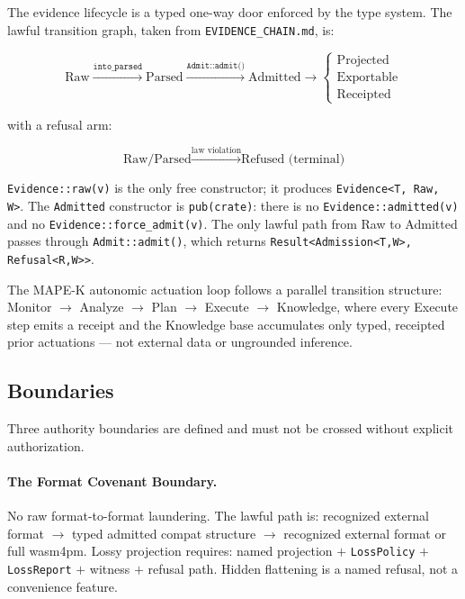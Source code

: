 The evidence lifecycle is a typed one-way door enforced by the type system. The lawful
transition graph, taken from \texttt{EVIDENCE\_CHAIN.md}, is:

\[
  \text{Raw} \xrightarrow{\texttt{into\_parsed}} \text{Parsed}
  \xrightarrow{\texttt{Admit::admit()}} \text{Admitted}
  \to \begin{cases}
    \text{Projected} \\
    \text{Exportable} \\
    \text{Receipted}
  \end{cases}
\]

with a refusal arm:

\[
  \text{Raw/Parsed} \xrightarrow{\text{law violation}} \text{Refused (terminal)}
\]

\texttt{Evidence::raw(v)} is the only free constructor; it produces
\texttt{Evidence\textless{}T, Raw, W\textgreater{}}. The \texttt{Admitted} constructor is
\texttt{pub(crate)}: there is no \texttt{Evidence::admitted(v)} and no
\texttt{Evidence::force\_admit(v)}. The only lawful path from Raw to Admitted passes through
\texttt{Admit::admit()}, which returns
\texttt{Result\textless{}Admission\textless{}T,W\textgreater{},
Refusal\textless{}R,W\textgreater{}\textgreater{}}.

The MAPE-K autonomic actuation loop follows a parallel transition structure: Monitor
$\to$ Analyze $\to$ Plan $\to$ Execute $\to$ Knowledge, where every Execute step emits a
receipt and the Knowledge base accumulates only typed, receipted prior actuations --- not
external data or ungrounded inference.

\subsection{Boundaries}
\label{sec:doctrine-architecture-boundaries}

Three authority boundaries are defined and must not be crossed without explicit authorization.

\paragraph{The Format Covenant Boundary.}
No raw format-to-format laundering. The lawful path is: recognized external format $\to$
typed admitted compat structure $\to$ recognized external format or full wasm4pm. Lossy
projection requires: named projection $+$ \texttt{LossPolicy} $+$ \texttt{LossReport} $+$
witness $+$ refusal path. Hidden flattening is a named refusal, not a convenience feature.


